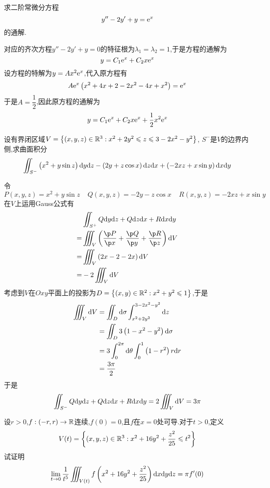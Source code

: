 \documentclass{ctexart}
\begin{document}
\begin{problem}[6.(10\songti{分})]
    求二阶常微分方程
        \[y''-2y'+y=\mathrm{e}^x\]
        的通解.
\end{problem}
\begin{solution}
    对应的齐次方程$y''-2y'+y=0$的特征根为$\lambda_1=\lambda_2=1$,于是方程的通解为
    \[y=C_1\mathrm{e}^x+C_2x\mathrm{e}^x\]
    设方程的特解为$y=Ax^2\mathrm{e}^x$,代入原方程有
    \[A\mathrm{e}^x\left(x^2+4x+2-2x^2-4x+x^2\right)=\mathrm{e}^x\]
    于是$A=\dfrac12$,因此原方程的通解为
    \[y=C_1\mathrm{e}^x+C_2x\mathrm{e}^x+\dfrac12x^2\mathrm{e}^x\]

\end{solution}
\begin{problem}[7.(10\songti{分})]
    设有界闭区域$V=\left\{(x,y,z)\in\mathbb{R}^3:x^2+2y^2\leqslant z\leqslant 3-2x^2-y^2\right\}$,%
        $S^-$是$V$的边界内侧,求曲面积分
        \[\iint_{S^-}\left(x^2+y\sin z\right)\mathrm{d} y\mathrm{d} z-\left(2y+z\cos x\right)\mathrm{d} z\mathrm{d} x+\left(-2xz+x\sin y\right)\mathrm{d} x\mathrm{d} y\]

\end{problem}
\begin{solution}
    令
    \[P(x,y,z)=x^2+y\sin z\ \ \ \ \ Q(x,y,z)=-2y-z\cos x\ \ \ \ \ R(x,y,z)=-2xz+x\sin y\]
    在$V$上运用Gauss公式有
    \[\begin{aligned}
        &\iint_{S^+}Q\di y\di z+Q\di z\di x+R\di x\di y\\
        =&\iiint_V\left(\dfrac{\p P}{\p x}+\dfrac{\p Q}{\p y}+\dfrac{\p R}{\p z}\right)\di V \\
        =&\iiint_V\left(2x-2-2x\right)\di V \\
        =&-2\iiint_V\di V
    \end{aligned}\]
    考虑到$V$在$Oxy$平面上的投影为$D=\left\{(x,y)\in\mathbb{R}^2:x^2+y^2\leqslant1\right\}$,于是
    \[\begin{aligned}
        \iiint_V\mathrm{d} V
        &= \iint_D\mathrm{d}\sigma\int_{x^2+2y^2}^{3-2x^2-y^2}\mathrm{d} z \\
        &= \iint_D3\left(1-x^2-y^2\right)\mathrm{d}\sigma \\
        &= 3\int_0^{2\pi}\mathrm{d}\theta\int_0^1\left(1-r^2\right)r\mathrm{d} r \\
        &= \dfrac{3\pi}{2}
    \end{aligned}\]
    于是
    \[\iint_{S^-}Q\mathrm{d} y\mathrm{d} z+Q\mathrm{d} z\mathrm{d} x+R\mathrm{d} x\mathrm{d} y=2\iiint_{V}\mathrm{d} V=3\pi\]

\end{solution}
\begin{problem}[8.(15\songti{分})]
    设$r>0$,$f:(-r,r)\to\mathbb{R}$连续,$f(0)=0$,且$f$在$x=0$处可导.对于$t>0$,定义
    \[V(t)=\left\{(x,y,z)\in\mathbb{R}^3:x^2+16y^2+\dfrac{z^2}{25}\leqslant t^2\right\}\]
    试证明
    \[\lim_{t\to0}\dfrac{1}{t^5}\iiint_{V(t)}f\left(x^2+16y^2+\dfrac{z^2}{25}\right)\mathrm{d} x\mathrm{d} y\mathrm{d} z=\pi f'(0)\]

\end{problem}
\end{document}
